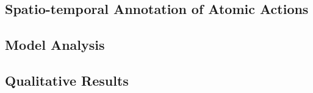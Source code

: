 \subsection{Spatio-temporal Annotation of Atomic Actions}

\subsection{Model Analysis}

\subsection{Qualitative Results}

\begin{comment}
\todo[inline]{texto a continuación es original de Ivan}

[GENERAL IDEA]

What we want to show:
\begin{itemize}
\item Show tables of results that can be useful to compare the model.
\item Show how the model is useful for videos of simple and composed actions, since now the level of annotations is similar.
\item Show how the inference produces annotated data (poses, actions, etc). In particular, show in Composable Activities and Concurrent actions how the action compositions are handled by the model without post-processing.
\item Show results in sub-JHMDB,showing how the model detects the action in the videos and also which part of the body performs the action (search for well-behaved videos). It could be interesting to show the annotated data over real RGB videos. 
\item Show examples of poses (like poselets) and sequences of 3 or 5 poses for actions (Actionlets?)
\end{itemize}

\subsection{Figures}
The list of figures should include:
\begin{itemize}
\item A figure showing the recognition and mid-level labels of Composable Activities, using RGB videos
\item Comparison of action annotations, real v/s inferred in training set, showing we can recover (almost) the original annotations.
\item Show a figure similar to Concurrent Actions paper, with a timeline showing the actions in color. We can show that our inference is more stable than proposed in that paper, and it is visually more similar to the ground truth than the other methods.
\item Show a figure for sub-JHMDB dataset, where we can detect temporally and spatially the action without annotations in the training set.
\item Show Composable Activities and sub-JHMDB  the most representative poses and actions.
\end{itemize}



\end{comment}
